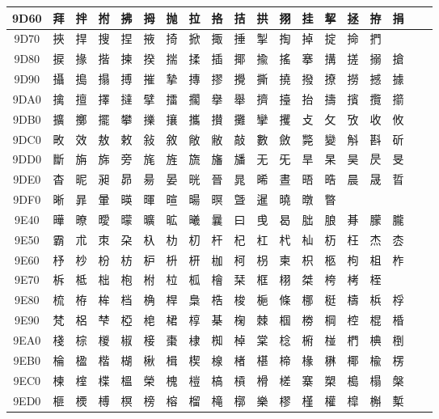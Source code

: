 \begin{table}[H]
\begin{tabular}{|Sc|*{16}{>{\centering\arraybackslash}p{1em}|}>{\centering\arraybackslash}p{2.5em}|}
9D60 & 拜 & 拌 & 拊 & 拂 & 拇 & 抛 & 拉 & 挌 & 拮 & 拱 & 挧 & 挂 & 挈 & 拯 & 拵 & 捐 \\ \hline
9D70 & 挾 & 捍 & 搜 & 捏 & 掖 & 掎 & 掀 & 掫 & 捶 & 掣 & 掏 & 掉 & 掟 & 掵 & 捫 & \\ \hline
9D80 & 捩 & 掾 & 揩 & 揀 & 揆 & 揣 & 揉 & 插 & 揶 & 揄 & 搖 & 搴 & 搆 & 搓 & 搦 & 搶 \\ \hline
9D90 & 攝 & 搗 & 搨 & 搏 & 摧 & 摯 & 摶 & 摎 & 攪 & 撕 & 撓 & 撥 & 撩 & 撈 & 撼 & 據 \\ \hline
9DA0 & 擒 & 擅 & 擇 & 撻 & 擘 & 擂 & 擱 & 擧 & 舉 & 擠 & 擡 & 抬 & 擣 & 擯 & 攬 & 擶 \\ \hline
9DB0 & 擴 & 擲 & 擺 & 攀 & 擽 & 攘 & 攜 & 攅 & 攤 & 攣 & 攫 & 攴 & 攵 & 攷 & 收 & 攸 \\ \hline
9DC0 & 畋 & 效 & 敖 & 敕 & 敍 & 敘 & 敞 & 敝 & 敲 & 數 & 斂 & 斃 & 變 & 斛 & 斟 & 斫 \\ \hline
9DD0 & 斷 & 旃 & 旆 & 旁 & 旄 & 旌 & 旒 & 旛 & 旙 & 无 & 旡 & 旱 & 杲 & 昊 & 昃 & 旻 \\ \hline
9DE0 & 杳 & 昵 & 昶 & 昴 & 昜 & 晏 & 晄 & 晉 & 晁 & 晞 & 晝 & 晤 & 晧 & 晨 & 晟 & 晢 \\ \hline
9DF0 & 晰 & 暃 & 暈 & 暎 & 暉 & 暄 & 暘 & 暝 & 曁 & 暹 & 曉 & 暾 & 暼 & & & \\ \hline
9E40 & 曄 & 暸 & 曖 & 曚 & 曠 & 昿 & 曦 & 曩 & 曰 & 曵 & 曷 & 朏 & 朖 & 朞 & 朦 & 朧 \\ \hline
9E50 & 霸 & 朮 & 朿 & 朶 & 杁 & 朸 & 朷 & 杆 & 杞 & 杠 & 杙 & 杣 & 杤 & 枉 & 杰 & 枩 \\ \hline
9E60 & 杼 & 杪 & 枌 & 枋 & 枦 & 枡 & 枅 & 枷 & 柯 & 枴 & 柬 & 枳 & 柩 & 枸 & 柤 & 柞 \\ \hline
9E70 & 柝 & 柢 & 柮 & 枹 & 柎 & 柆 & 柧 & 檜 & 栞 & 框 & 栩 & 桀 & 桍 & 栲 & 桎 & \\ \hline
9E80 & 梳 & 栫 & 桙 & 档 & 桷 & 桿 & 梟 & 梏 & 梭 & 梔 & 條 & 梛 & 梃 & 檮 & 梹 & 桴 \\ \hline
9E90 & 梵 & 梠 & 梺 & 椏 & 梍 & 桾 & 椁 & 棊 & 椈 & 棘 & 椢 & 椦 & 棡 & 椌 & 棍 & 棔 \\ \hline
9EA0 & 棧 & 棕 & 椶 & 椒 & 椄 & 棗 & 棣 & 椥 & 棹 & 棠 & 棯 & 椨 & 椪 & 椚 & 椣 & 椡 \\ \hline
9EB0 & 棆 & 楹 & 楷 & 楜 & 楸 & 楫 & 楔 & 楾 & 楮 & 椹 & 楴 & 椽 & 楙 & 椰 & 楡 & 楞 \\ \hline
9EC0 & 楝 & 榁 & 楪 & 榲 & 榮 & 槐 & 榿 & 槁 & 槓 & 榾 & 槎 & 寨 & 槊 & 槝 & 榻 & 槃 \\ \hline
9ED0 & 榧 & 樮 & 榑 & 榠 & 榜 & 榕 & 榴 & 槞 & 槨 & 樂 & 樛 & 槿 & 權 & 槹 & 槲 & 槧 \\ \hline

\end{tabular}
\end{table}
